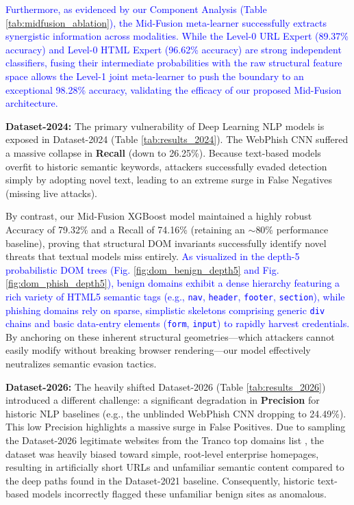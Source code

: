 \documentclass[conference]{IEEEtran}
\begin{document}
\textcolor{blue}{Furthermore, as evidenced by our Component Analysis (Table \ref{tab:midfusion_ablation}), the Mid-Fusion meta-learner successfully extracts synergistic information across modalities. While the Level-0 URL Expert (89.37\% accuracy) and Level-0 HTML Expert (96.62\% accuracy) are strong independent classifiers, fusing their intermediate probabilities with the raw structural feature space allows the Level-1 joint meta-learner to push the boundary to an exceptional 98.28\% accuracy, validating the efficacy of our proposed Mid-Fusion architecture.}

\textbf{Dataset-2024:} The primary vulnerability of Deep Learning NLP models is exposed in Dataset-2024 (Table \ref{tab:results_2024}). The WebPhish CNN suffered a massive collapse in \textbf{Recall} (down to 26.25\%). Because text-based models overfit to historic semantic keywords, attackers successfully evaded detection simply by adopting novel text, leading to an extreme surge in False Negatives (missing live attacks). 

By contrast, our Mid-Fusion XGBoost model maintained a highly robust Accuracy of 79.32\% and a Recall of 74.16\% (retaining an $\sim$80\% performance baseline), proving that structural DOM invariants successfully identify novel threats that textual models miss entirely. \textcolor{blue}{As visualized in the depth-5 probabilistic DOM trees (Fig. \ref{fig:dom_benign_depth5} and Fig. \ref{fig:dom_phish_depth5}), benign domains exhibit a dense hierarchy featuring a rich variety of HTML5 semantic tags (e.g., \texttt{nav}, \texttt{header}, \texttt{footer}, \texttt{section}), while phishing domains rely on sparse, simplistic skeletons comprising generic \texttt{div} chains and basic data-entry elements (\texttt{form}, \texttt{input}) to rapidly harvest credentials.} By anchoring on these inherent structural geometries—which attackers cannot easily modify without breaking browser rendering—our model effectively neutralizes semantic evasion tactics.

\textbf{Dataset-2026:} The heavily shifted Dataset-2026 (Table \ref{tab:results_2026}) introduced a different challenge: a significant degradation in \textbf{Precision} for historic NLP baselines (e.g., the unblinded WebPhish CNN dropping to 24.49\%). This low Precision highlights a massive surge in False Positives. Due to sampling the Dataset-2026 legitimate websites from the Tranco top domains list \cite{tranco}, the dataset was heavily biased toward simple, root-level enterprise homepages, resulting in artificially short URLs and unfamiliar semantic content compared to the deep paths found in the Dataset-2021 baseline. Consequently, historic text-based models incorrectly flagged these unfamiliar benign sites as anomalous.
\end{document}

